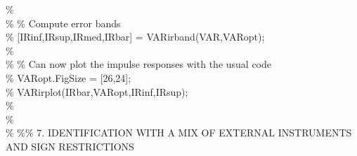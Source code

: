 \hspace{1mm}\hspace{5mm} \hspace{5mm} \textcolor{matlabgreen}{\%  }\\ 
\hspace{1mm}\hspace{5mm} \hspace{5mm} \textcolor{matlabgreen}{\% }\textcolor{matlabgreen}{\% Compute error bands }\\ 
\hspace{1mm}\hspace{5mm} \hspace{5mm} \textcolor{matlabgreen}{\% [IRinf,IRsup,IRmed,IRbar] = VARirband(VAR,VARopt); }\\ 
\hspace{1mm}\hspace{5mm} \hspace{5mm} \textcolor{matlabgreen}{\%  }\\ 
\hspace{1mm}\hspace{5mm} \hspace{5mm} \textcolor{matlabgreen}{\% }\textcolor{matlabgreen}{\% Can now plot the impulse responses with the usual code }\\ 
\hspace{1mm}\hspace{5mm} \hspace{5mm} \textcolor{matlabgreen}{\% VARopt.FigSize = [26,24]; }\\ 
\hspace{1mm}\hspace{5mm} \hspace{5mm} \textcolor{matlabgreen}{\% VARirplot(IRbar,VARopt,IRinf,IRsup); }\\ 
\hspace{1mm}\hspace{5mm} \hspace{5mm} \textcolor{matlabgreen}{\%  }\\ 
\hspace{1mm}\hspace{5mm} \hspace{5mm} \textcolor{matlabgreen}{\%  }\\ 
\hspace{1mm}\hspace{5mm} \hspace{5mm} \textcolor{matlabgreen}{\% }\textcolor{matlabgreen}{\%}\textcolor{matlabgreen}{\% 7. IDENTIFICATION WITH A MIX OF EXTERNAL INSTRUMENTS AND SIGN RESTRICTIONS }\\ 
